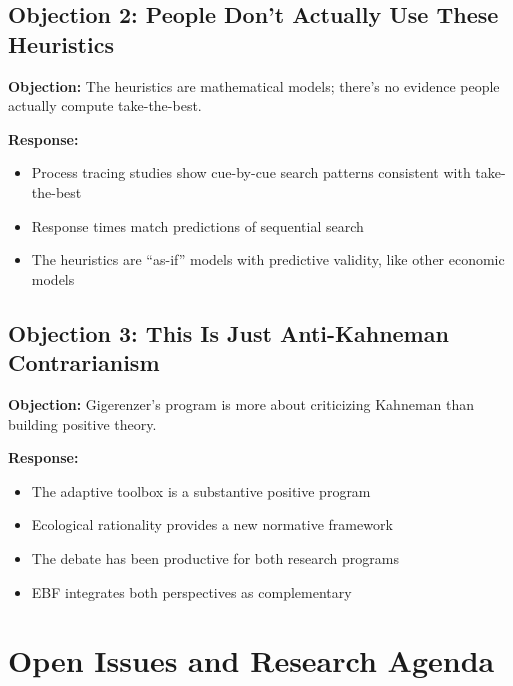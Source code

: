 \subsection{Objection 2: People Don't Actually Use These Heuristics}

\textbf{Objection:} The heuristics are mathematical models; there's no evidence people actually compute take-the-best.

\textbf{Response:}
\begin{itemize}[nosep]
\item Process tracing studies show cue-by-cue search patterns consistent with take-the-best
\item Response times match predictions of sequential search
\item The heuristics are ``as-if'' models with predictive validity, like other economic models
\end{itemize}

\subsection{Objection 3: This Is Just Anti-Kahneman Contrarianism}

\textbf{Objection:} Gigerenzer's program is more about criticizing Kahneman than building positive theory.

\textbf{Response:}
\begin{itemize}[nosep]
\item The adaptive toolbox is a substantive positive program
\item Ecological rationality provides a new normative framework
\item The debate has been productive for both research programs
\item EBF integrates both perspectives as complementary
\end{itemize}


\section{Open Issues and Research Agenda}
\label{sec:gi-open}

